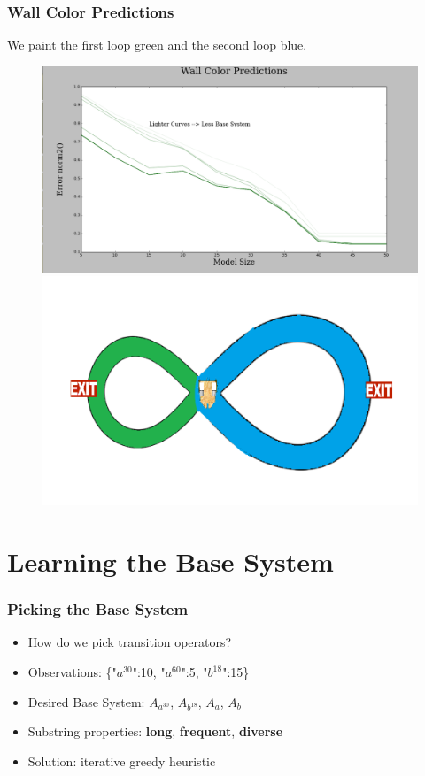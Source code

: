 \documentclass{beamer}
\begin{document}

\begin{frame}
\frametitle{Wall Color Predictions}
We paint the first loop green and the second loop blue.
\begin{figure}
\includegraphics[width=0.5\linewidth]{lucasplots/monImages/WallColorPredictions.png}
\includegraphics[width=0.5\linewidth]{lucasplots/monImages/doubleLoopImageMO.png}

\end{figure}
\end{frame}



\section{Learning the Base System}

\begin{frame}
\frametitle{Picking the Base System}
\begin{itemize}


\item How do we pick transition operators?
\item[] Observations: \{"$a^{30}$":10, "$a^{60}$":5, "$b^{18}$":15\}

\item[] Desired Base System: $A_{a^{30}}$, $A_{b^{18}}$, $A_a$, $A_b$

\item Substring properties: 
\textbf{long}, \textbf{frequent}, \textbf{diverse}

\item Solution: iterative greedy heuristic 


\end{itemize}
\end{frame}
\end{document}
